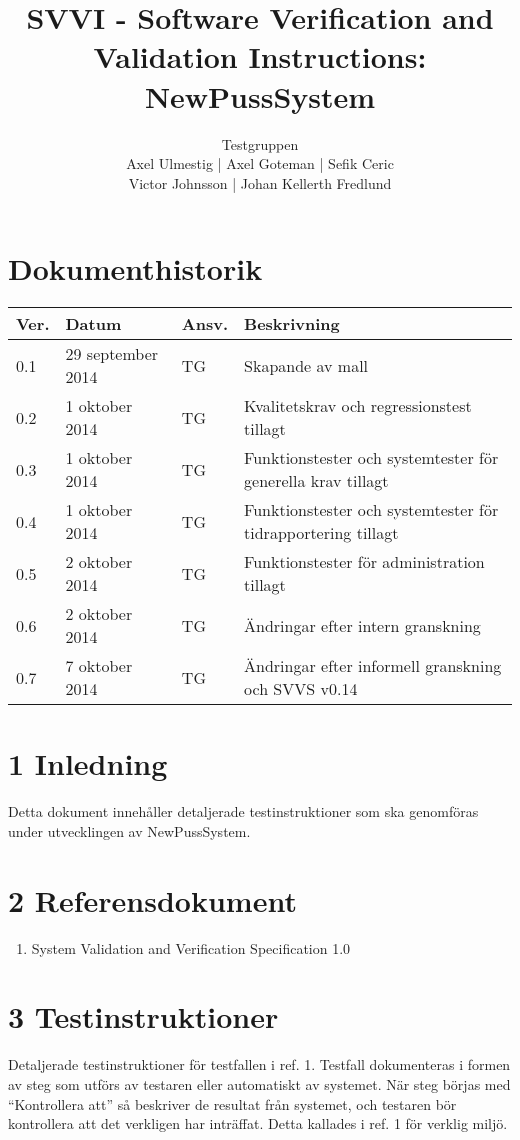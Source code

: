 \documentclass[a4paper]{article}
\title{SVVI - Software Verification and Validation Instructions: NewPussSystem}
\author{Testgruppen \\ Axel Ulmestig | Axel Goteman | Sefik Ceric \\ Victor Johnsson | Johan Kellerth Fredlund}
\date{}
\begin{document}
\maketitle
\thispagestyle{fancy}
\tableofcontents
\newpage

\section*{Dokumenthistorik}

\begin{tabular}{ l l l p{9cm} }
Ver. & Datum & Ansv. & Beskrivning \\\hline
0.1 & 29 september 2014 & TG & Skapande av mall \\
0.2 & 1 oktober 2014 & TG & Kvalitetskrav och regressionstest tillagt \\
0.3 & 1 oktober 2014 & TG & Funktionstester och systemtester för generella krav tillagt\\
0.4 & 1 oktober 2014 & TG & Funktionstester och systemtester för tidrapportering tillagt\\
0.5 & 2 oktober 2014 & TG & Funktionstester för administration tillagt\\
0.6 & 2 oktober 2014 & TG & Ändringar efter intern granskning\\
0.7 & 7 oktober 2014 & TG & Ändringar efter informell granskning och SVVS v0.14\\

\end{tabular}
\section{1 Inledning}       

Detta dokument innehåller detaljerade testinstruktioner som ska genomföras under utvecklingen av NewPussSystem.

\section{2 Referensdokument}
\begin{enumerate}
\item System Validation and Verification Specification 1.0
\end{enumerate}



\section{3 Testinstruktioner}
Detaljerade testinstruktioner för testfallen i ref. 1. Testfall dokumenteras i formen av steg som utförs av testaren eller automatiskt av systemet. När steg börjas med ``Kontrollera att'' så beskriver de resultat från systemet, och testaren bör kontrollera att det verkligen har inträffat. Detta kallades i ref. 1 för verklig miljö.
\end{document}

